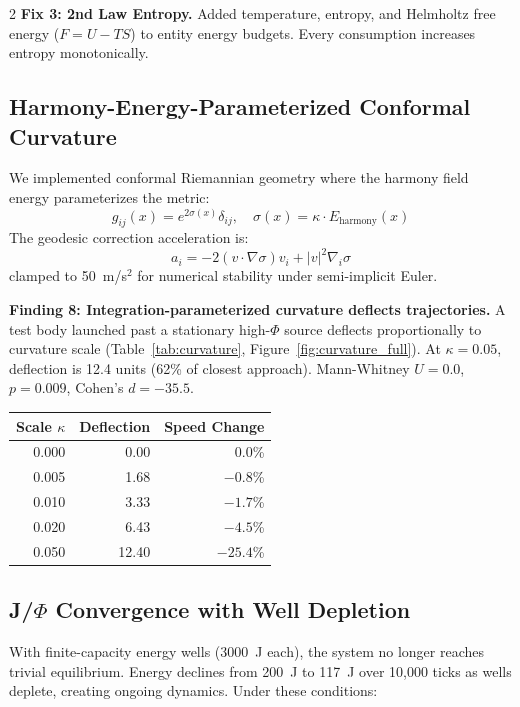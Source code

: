 \documentclass[letterpaper]{article}
\begin{document}
\begin{multicols}{2}
\textbf{Fix 3: 2nd Law Entropy.} Added temperature, entropy, and Helmholtz free energy ($F = U - TS$) to entity energy budgets. Every consumption increases entropy monotonically.

\subsection{Harmony-Energy-Parameterized Conformal Curvature}

We implemented conformal Riemannian geometry where the harmony field energy parameterizes the metric:
\begin{equation}
g_{ij}(x) = e^{2\sigma(x)} \delta_{ij}, \quad \sigma(x) = \kappa \cdot E_{\text{harmony}}(x)
\end{equation}
The geodesic correction acceleration is:
\begin{equation}
a_i = -2(v \cdot \nabla\sigma) v_i + |v|^2 \nabla_i\sigma
\end{equation}
clamped to 50~m/s$^2$ for numerical stability under semi-implicit Euler.

\textbf{Finding 8: Integration-parameterized curvature deflects trajectories.} A test body launched past a stationary high-$\Phi$ source deflects proportionally to curvature scale (Table~\ref{tab:curvature}, Figure~\ref{fig:curvature_full}). At $\kappa = 0.05$, deflection is 12.4 units (62\% of closest approach). Mann-Whitney $U = 0.0$, $p = 0.009$, Cohen's $d = -35.5$.

\begingroup
\centering
\small
{}
\label{tab:curvature}
\begin{tabular}{rrr}
\toprule
Scale $\kappa$ & Deflection & Speed Change \\
\midrule
0.000 & 0.00 & 0.0\% \\
0.005 & 1.68 & $-0.8$\% \\
0.010 & 3.33 & $-1.7$\% \\
0.020 & 6.43 & $-4.5$\% \\
0.050 & 12.40 & $-25.4$\% \\
\bottomrule
\end{tabular}
\endgroup

\subsection{J/$\Phi$ Convergence with Well Depletion}

With finite-capacity energy wells (3000~J each), the system no longer reaches trivial equilibrium. Energy declines from 200~J to 117~J over 10,000 ticks as wells deplete, creating ongoing dynamics. Under these conditions:


\end{multicols}
\end{document}
